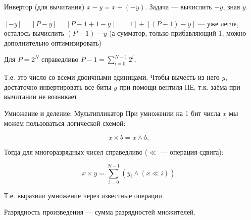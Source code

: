\documentclass[xetex,aspectratio=43]{beamer}
\begin{document}
\begin{frame}{Инвертор (для вычитания)}
    \(x-y = x+(-y)\). Задача --- вычислить \(-y\), зная \(y\).

    \([-y] = [P-y] = [P-1+1 - y] = [1] + [(P-1) - y]\) --- уже легче,
    осталось вычислить \((P-1) - y\) (а сумматор, только прибавляющий 1,
    можно дополнительно оптимизировать)

    Для \(P = 2^N\) справедливо \(P-1 = \displaystyle\sum_{i=0}^{N-1}2^i\).

    Т.е. это число со всеми двоичными единицами. Чтобы вычесть из него
    \(y\), достаточно инвертировать все биты \(y\) при помощи вентиля НЕ,
    т.к. заёма при вычитании не возникает
\end{frame}

\begin{frame}{Умножение и деление: Мультипликатор}
    При умножении на 1 бит числа \(x\) мы можем пользоваться логической
    схемой:

    \[x\times b = x \land b.\]

    Тогда для многоразрядных чисел справедливо (\(\ll\) --- операция
    сдвига):

    \[x \times y = \sum_{i=0}^{N-1} (y_i \land (x\ll i))\]

    Т.е. выразили умножение через известные операции.

    Разрядность произведения --- сумма разрядностей множителей.
\end{frame}
\end{document}
